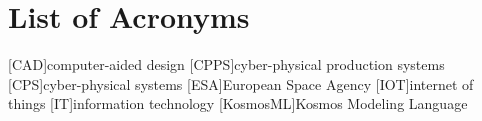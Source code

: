 \chapter*{List of Acronyms}
\begin{acronym}
    [CAD]{computer-aided design}
    [CPPS]{cyber-physical production systems}
    [CPS]{cyber-physical systems}
    [ESA]{European Space Agency}
    [IOT]{internet of things}
    [IT]{information technology}
    [KosmosML]{Kosmos Modeling Language}
\end{acronym}

